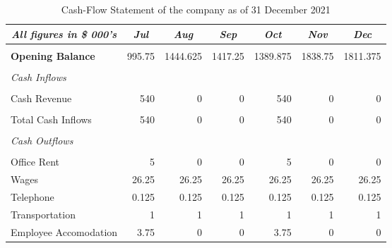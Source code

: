\begin{table}[htbp]
  \centering
  \caption{Cash-Flow Statement of the company as of 31 December 2021}
    \begin{tabular}{|l|r|r|r|r|r|r|}
    \toprule
    \hline
    \hline
    \multicolumn{1}{|c|}{\textit{\textbf{All figures in \$ 000's}}} & \multicolumn{1}{c|}{\textit{\textbf{Jul}}} & \multicolumn{1}{c|}{\textit{\textbf{Aug}}} & \multicolumn{1}{c|}{\textit{\textbf{Sep}}} & \multicolumn{1}{c|}{\textit{\textbf{Oct}}} & \multicolumn{1}{c|}{\textit{\textbf{Nov}}} & \multicolumn{1}{c|}{\textit{\textbf{Dec}}} \\
    \midrule
    \hline
    \hline
          &       &       &       &       &       &  \\
    \midrule
    \textbf{Opening Balance} & 995.75 & 1444.625 & 1417.25 & 1389.875 & 1838.75 & 1811.375 \\
    \midrule
          &       &       &       &       &       &  \\
    \midrule
    \textit{Cash Inflows} &       &       &       &       &       &  \\
    \midrule
          &       &       &       &       &       &  \\
    \midrule
    Cash Revenue & 540   & 0     & 0     & 540   & 0     & 0 \\
    \midrule
          &       &       &       &       &       &  \\
    \midrule
    Total Cash Inflows & 540   & 0     & 0     & 540   & 0     & 0 \\
    \midrule
          &       &       &       &       &       &  \\
    \midrule
    \textit{Cash Outflows} &       &       &       &       &       &  \\
    \midrule
          &       &       &       &       &       &  \\
    \midrule
    Office Rent  & 5     & 0     & 0     & 5     & 0     & 0 \\
    \midrule
    Wages & 26.25 & 26.25 & 26.25 & 26.25 & 26.25 & 26.25 \\
    \midrule
    Telephone & 0.125 & 0.125 & 0.125 & 0.125 & 0.125 & 0.125 \\
    \midrule
    Transportation & 1     & 1     & 1     & 1     & 1     & 1 \\
    \midrule
    Employee Accomodation & 3.75  & 0     & 0     & 3.75  & 0     & 0 \\

\end{tabular}
\end{table}
